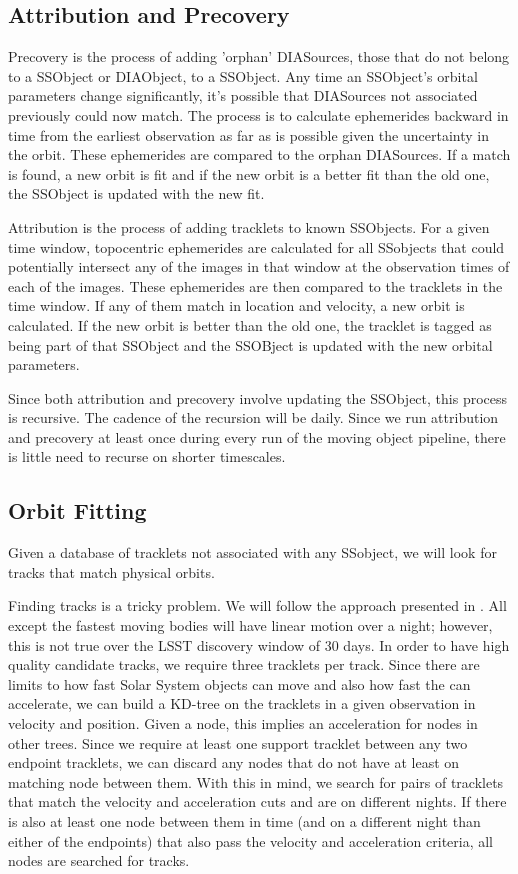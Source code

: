 \subsection{Attribution and Precovery}
\label{sec:acAttributionAndPrecovery}
Precovery is the process of adding 'orphan' DIASources, those that do not belong to a SSObject or DIAObject, to a SSObject.  Any time an SSObject's orbital parameters change significantly, it's possible that DIASources not associated previously could now match.  The process is to calculate ephemerides backward in time from the earliest observation as far as is possible given the uncertainty in the orbit.  These ephemerides are compared to the orphan DIASources.  If a match is found, a new orbit is fit and if the new orbit is a better fit than the old one, the SSObject is updated with the new fit.

Attribution is the process of adding tracklets to known SSObjects.  For a given time window, topocentric ephemerides are calculated for all SSobjects that could potentially intersect any of the images in that window at the observation times of each of the images.  These ephemerides are then compared to the tracklets in the time window.  If any of them match in location and velocity, a new orbit is calculated.  If the new orbit is better than the old one, the tracklet is tagged as being part of that SSObject and the SSOBject is updated with the new orbital parameters.

Since both attribution and precovery involve updating the SSObject, this process is recursive.  The cadence of the recursion will be daily.  Since we run attribution and precovery at least once during every run of the moving object pipeline, there is little need to recurse on shorter timescales.


\subsection{Orbit Fitting}
\label{sec:acOrbitFitting}
Given a database of tracklets not associated with any SSobject, we will look for tracks that match physical orbits.

Finding tracks is a tricky problem.  We will follow the approach presented in \cite{2007ASPC..376..395K}.  All except the fastest moving bodies will have linear motion over a night; however, this is not true over the LSST discovery window of 30 days.  In order to have high quality candidate tracks, we require three tracklets per track.  Since there are limits to how fast Solar System objects can move and also how fast the can accelerate, we can build a KD-tree on the tracklets in a given observation in velocity and position.  Given a node, this implies an acceleration for nodes in other trees.  Since we require at least one support tracklet between any two endpoint tracklets, we can discard any nodes that do not have at least on matching node between them.  With this in mind, we search for pairs of tracklets that match the velocity and acceleration cuts and are on different nights.  If there is also at least one node between them in time (and on a different night than either of the endpoints) that also pass the velocity and acceleration criteria, all nodes are searched for tracks.

